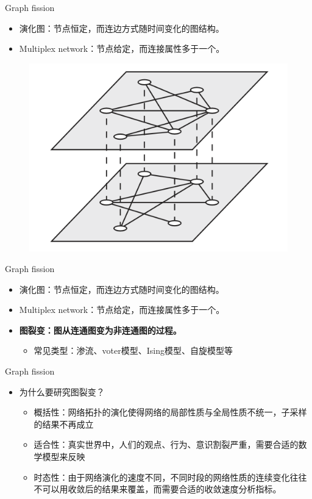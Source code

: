 \documentclass{beamer}
\begin{document}
\begin{frame}{Graph fission}

\begin{itemize}
    \item 演化图：节点恒定，而连边方式随时间变化的图结构。
    \item Multiplex network：节点给定，而连接属性多于一个。
\end{itemize}
\begin{figure}
\centering
\includegraphics[width = 0.5\linewidth]{figs/截屏2020-07-10 下午7.11.46.png}    
\end{figure}

\end{frame}

\begin{frame}{Graph fission}

\begin{itemize}
    \item 演化图：节点恒定，而连边方式随时间变化的图结构。
    \item Multiplex network：节点给定，而连接属性多于一个。
    \item \textbf{图裂变：图从连通图变为非连通图的过程。}
    \begin{itemize}
        \item 常见类型：渗流、voter模型、Ising模型、自旋模型等
    \end{itemize}
\end{itemize}
\end{frame}

\begin{frame}{Graph fission}

\begin{itemize}
    \item 为什么要研究图裂变？
    \begin{itemize}
        \item 概括性：网络拓扑的演化使得网络的局部性质与全局性质不统一，子采样的结果不再成立
        \item 适合性：真实世界中，人们的观点、行为、意识割裂严重，需要合适的数学模型来反映
        \item 时态性：由于网络演化的速度不同，不同时段的网络性质的连续变化往往不可以用收敛后的结果来覆盖，而需要合适的收敛速度分析指标。
    \end{itemize}
\end{itemize}
\end{frame}
\end{document}
